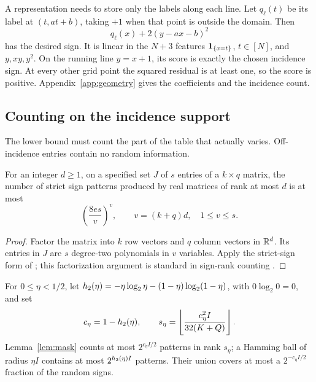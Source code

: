 A representation needs to store only the labels along each line. Let $q_\ell(t)$ be its label at $(t,at+b)$, taking $+1$ when that point is outside the domain. Then
\begin{equation}
 q_\ell(x)+2(y-ax-b)^2
 \label{eq:representation-score}
\end{equation}
has the desired sign. It is linear in the $N+3$ features $\mathbf 1_{\{x=t\}}$, $t\in[N]$, and $y,xy,y^2$. On the running line $y=x+1$, its score is exactly the chosen incidence sign. At every other grid point the squared residual is at least one, so the score is positive. Appendix~\ref{app:geometry} gives the coefficients and the incidence count.

\subsection{Counting on the incidence support}
The lower bound must count the part of the table that actually varies. Off-incidence entries contain no random information.

\begin{lemma}\label{lem:mask}
For an integer $d\ge1$, on a specified set $J$ of $s$ entries of a $k\times q$ matrix, the number of strict sign patterns produced by real matrices of rank at most $d$ is at most
\begin{equation}
 \left(\frac{8es}{v}\right)^v,\qquad v=(k+q)d,\quad 1\le v\le s.
 \label{eq:maskcount}
\end{equation}
\end{lemma}

\begin{proof}
Factor the matrix into $k$ row vectors and $q$ column vectors in $\mathbb R^d$. Its entries in $J$ are $s$ degree-two polynomials in $v$ variables. Apply the strict-sign form of \citet{Warren68}; this factorization argument is standard in sign-rank counting \citep{AMY16}.
\end{proof}

For $0\le\eta<1/2$, let $h_2(\eta)=-\eta\log_2\eta-(1-\eta)\log_2(1-\eta)$, with $0\log_2 0=0$, and set
\begin{equation}
 c_\eta=1-h_2(\eta),\qquad
 s_\eta=\left\lfloor\frac{c_\eta^2 I}{32(K+Q)}\right\rfloor.
 \label{eq:seta}
\end{equation}
Lemma~\ref{lem:mask} counts at most $2^{c_\eta I/2}$ patterns in rank $s_\eta$; a Hamming ball of radius $\eta I$ contains at most $2^{h_2(\eta)I}$ patterns. Their union covers at most a $2^{-c_\eta I/2}$ fraction of the random signs.

